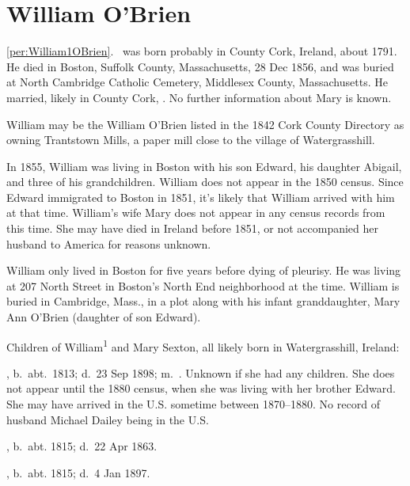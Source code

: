 \section{William O'Brien}

\ref{per:William1OBrien}.\  was born probably in County Cork, Ireland, about 1791.\cite{Census1855William} He died in Boston, Suffolk County, Massachusetts, 28 Dec 1856,\cite{William1OBrienDeath} and was buried at North Cambridge Catholic Cemetery, Middlesex County, Massachusetts.\cite{DianaBerberenaLetter} He married, likely in County Cork, .\cite{Michael2OBrienDeath,Abigail2OBrienDeath,Ann2OBrienDeath,Mary2OBrienDeath} No further information about Mary is known.

William may be the William O'Brien listed in the 1842 Cork County Directory as owning Trantstown Mills, a paper mill close to the village of Watergrasshill.\cite{Jacksons}

In 1855, William was living in Boston with his son Edward, his daughter Abigail, and three of his grandchildren.\cite{Census1855William} William does not appear in the 1850 census. Since Edward immigrated to Boston in 1851\cite{Edward2OBrienNaturalization}, it's likely that William arrived with him at that time. William's wife Mary does not appear in any census records from this time. She may have died in Ireland before 1851, or not accompanied her husband to America for reasons unknown.

William only lived in Boston for five years before dying of pleurisy. He was living at 207 North Street in Boston's North End neighborhood at the time.\cite{William1OBrienDeath} William is buried in Cambridge, Mass., in a plot along with his infant granddaughter, Mary Ann O'Brien (daughter of son Edward).\cite{DianaBerberenaLetter} 

\begin{KidsIntro}
	Children of William\textsuperscript{1} and Mary Sexton, all likely born in Watergrasshill, Ireland:
\end{KidsIntro}

\begin{Kids}
	, b.\ abt.\ 1813;\cite{1880CensusAnn} d.\ 23 Sep 1898; m.\ .\cite{Ann2OBrienDeath} Unknown if she had any children. She does not appear until the 1880 census, when she was living with her brother Edward. She may have arrived in the U.S. sometime between 1870--1880. No record of husband Michael Dailey being in the U.S.
	
	, b.\ abt. 1815; d.\ 22 Apr 1863.
	
	, b.\ abt. 1815; d.\ 4 Jan 1897.
			
\end{Kids}
